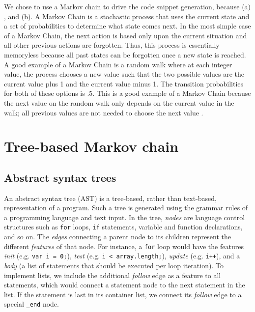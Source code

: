 \documentclass{article}
\begin{document}
We chose to use a Markov chain to drive the code snippet generation, because
(a) , and (b). A Markov Chain is a stochastic process
that uses the current state and a set of probabilities to determine what state
comes next. In the most simple case of a Markov Chain, the next action is based
only upon the current situation and all other previous actions are forgotten.
Thus, this process is essentially memoryless because all past states can be
forgotten once a new state is reached. A good example of a Markov Chain is a
random walk where at each integer value, the process chooses a new value such
that the two possible values are the current value plus 1 and the current value
minus 1. The transition probabilities for both of these options is .5. This is a
good example of a Markov Chain because the next value on the random walk only
depends on the current value in the walk; all previous values are not needed to
choose the next value \cite{markov}.


\section{Tree-based Markov chain}

\subsection{Abstract syntax trees}

An abstract syntax tree (AST) is a tree-based, rather than text-based, representation of a program.
Such a tree is generated using the grammar rules of a programming language and text input. In the tree, \emph{nodes}
are language control structures such as {\tt for} loops, {\tt if} statements, variable and function
declarations, and so on. The \emph{edges} connecting a parent node to its children represent the different \emph{features}
of that node. For instance, a {\tt for} loop would have the features \emph{init} (e.g. {\tt var i = 0;}),
\emph{test} (e.g. {\tt i < array.length;}), \emph{update} (e.g. {\tt i++}), and a \emph{body} (a list
of statements that should be executed per loop iteration). To implement lists, we include the additional
\emph{follow} edge as a feature to all statements, which would connect a statement node to the next statement
in the list. If the statement is last in its container list, we connect its \emph{follow} edge to a special
{\tt {\_end}} node.
\end{document}
